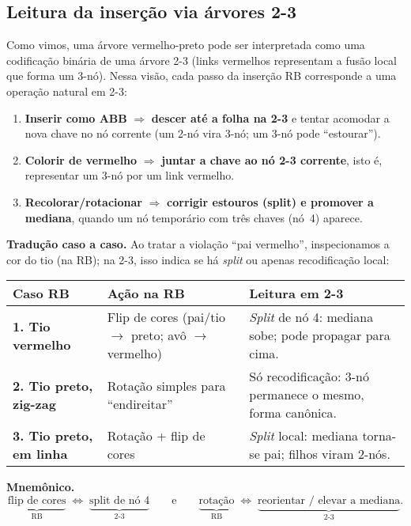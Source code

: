 \subsection*{Leitura da inserção via árvores 2-3}

Como vimos, uma árvore vermelho-preto pode ser interpretada como uma codificação binária de uma árvore 2-3 (links vermelhos representam a fusão local que forma um 3-nó). Nessa visão, cada passo da inserção RB corresponde a uma operação natural em 2-3:

\begin{enumerate}
  \item \textbf{Inserir como ABB} $\Rightarrow$ \textbf{descer até a folha na 2-3} e tentar acomodar a nova chave no nó corrente (um 2-nó vira 3-nó; um 3-nó pode “estourar”).
  \item \textbf{Colorir de vermelho} $\Rightarrow$ \textbf{juntar a chave ao nó 2-3 corrente}, isto é, representar um 3-nó por um link vermelho.
  \item \textbf{Recolorar/rotacionar} $\Rightarrow$ \textbf{corrigir estouros (split) e promover a mediana}, quando um nó temporário com três chaves (nó~4) aparece.
\end{enumerate}

\noindent\textbf{Tradução caso a caso.}
Ao tratar a violação ``pai vermelho'', inspecionamos a cor do tio (na RB); na 2-3, isso indica se há \emph{split} ou apenas recodificação local:

\begin{center}
\renewcommand{\arraystretch}{1.2}
\begin{tabularx}{\linewidth}{@{}>{\bfseries}l >{\raggedright\arraybackslash}X >{\raggedright\arraybackslash}X@{}}
\toprule
Caso RB & Ação na RB & Leitura em 2-3 \\
\midrule
1. Tio vermelho & Flip de cores (pai/tio $\to$ preto; avô $\to$ vermelho) &
\emph{Split} de nó 4: mediana sobe; pode propagar para cima. \\
2. Tio preto, zig-zag & Rotação simples para “endireitar” &
Só recodificação: 3-nó permanece o mesmo, forma canônica. \\
3. Tio preto, em linha & Rotação + flip de cores &
\emph{Split} local: mediana torna-se pai; filhos viram 2-nós. \\
\bottomrule
\end{tabularx}
\end{center}

\noindent\textbf{Mnemônico.}
\[
\underbrace{\text{flip de cores}}_{\text{RB}}
\;\Longleftrightarrow\;
\underbrace{\text{split de nó 4}}_{\text{2-3}}
\qquad\text{e}\qquad
\underbrace{\text{rotação}}_{\text{RB}}
\;\Longleftrightarrow\;
\underbrace{\text{reorientar / elevar a mediana}}_{\text{2-3}}.
\]

